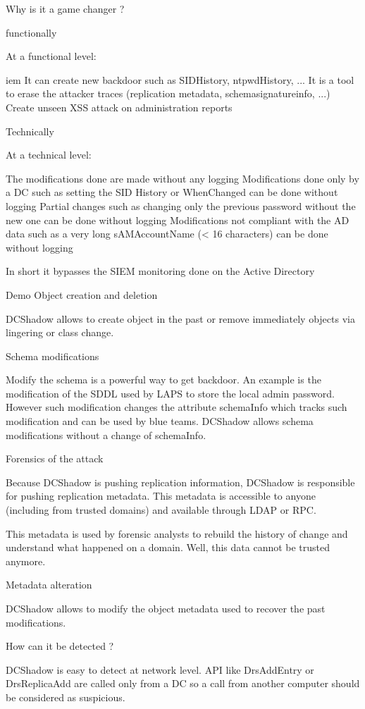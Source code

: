 Why is it a game changer ?

functionally

At a functional level:


iem It can create new backdoor such as SIDHistory, ntpwdHistory, ...
It is a tool to erase the attacker traces (replication metadata, schemasignatureinfo, ...)
Create unseen XSS attack on administration reports


Technically

At a technical level:


The modifications done are made without any logging
Modifications done only by a DC such as setting the SID History or WhenChanged can be done without logging
Partial changes such as changing only the previous password without the new one can be done without logging
Modifications not compliant with the AD data such as a very long sAMAccountName (< 16 characters) can be done without logging

In short it bypasses the SIEM monitoring done on the Active Directory

Demo
Object creation and deletion

DCShadow allows to create object in the past or remove immediately objects via lingering or class change.

Schema modifications

Modify the schema is a powerful way to get backdoor. An example is the modification of the SDDL used by LAPS to store the local admin password. However such modification changes the attribute schemaInfo which tracks such modification and can be used by blue teams. DCShadow allows schema modifications without a change of schemaInfo.

Forensics of the attack

Because DCShadow is pushing replication information, DCShadow is responsible for pushing replication metadata. This metadata is accessible to anyone (including from trusted domains) and available through LDAP or RPC.

This metadata is used by forensic analysts to rebuild the history of change and understand what happened on a domain. Well, this data cannot be trusted anymore.

Metadata alteration

DCShadow allows to modify the object metadata used to recover the past modifications.

How can it be detected ?

DCShadow is easy to detect at network level. API like DrsAddEntry or DrsReplicaAdd are called only from a DC so a call from another computer should be considered as suspicious.

